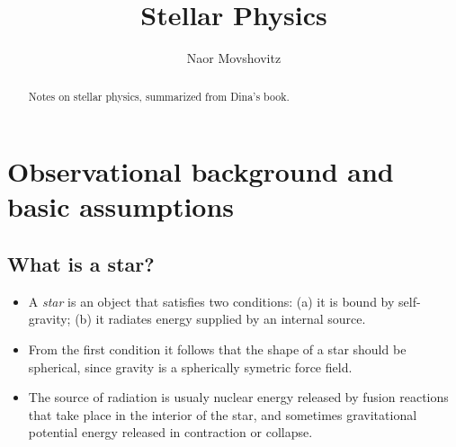 \documentclass[10pt,amsmath,amssymb,aps,pra]{revtex4-2}
\begin{document}
\title{Stellar Physics}
\author{Naor Movshovitz}

\begin{abstract}
Notes on stellar physics, summarized from Dina's book.
\end{abstract}

\maketitle

\tableofcontents

\section{Observational background and basic assumptions}
\subsection{What is a star?}
\begin{itemize}
\item A \emph{star} is an object that satisfies two conditions: (a) it is
bound by self-gravity; (b) it radiates energy supplied by an internal source.

\item From the first condition it follows that the shape of a star should be
spherical, since gravity is a spherically symetric force field.

\item The source of radiation is usualy nuclear energy released by fusion
reactions that take place in the interior of the star, and sometimes
gravitational potential energy released in contraction or collapse.
\end{itemize}
\end{document}
